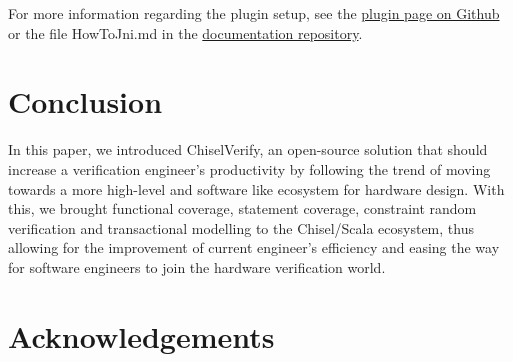 \documentclass[conference]{IEEEtran}
\begin{document}
For more information regarding the plugin setup, see the \href{https://github.com/jodersky/sbt-jni}{plugin page on Github} or the file HowToJni.md in the \href{https://github.com/chisel-uvm/documentation}{documentation repository}.

\section{Conclusion}
In this paper, we introduced ChiselVerify, an open-source solution that should increase a verification engineer's productivity by following the trend of moving towards a more high-level and software like ecosystem for hardware design. With this, we brought functional coverage, statement coverage, constraint random verification and transactional modelling to the Chisel/Scala ecosystem, thus allowing for the improvement of current engineer's efficiency and easing the way for software engineers to join the hardware verification world.

\section{Acknowledgements}



\end{document}
